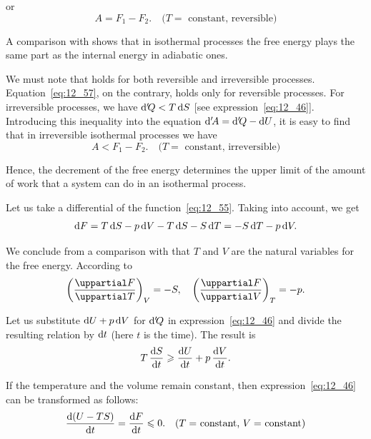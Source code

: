 \noindent
or
\begin{equation}\label{eq:12_57}
	A = F_1 - F_2.\quad \text{($T = $ constant, reversible)}
\end{equation}

\noindent
A comparison with  shows that in isothermal processes the free energy plays the same part as the internal energy in adiabatic ones.

We must note that  holds for both reversible and irreversible processes. Equation~\eqref{eq:12_57}, on the contrary, holds only for reversible processes. For irreversible processes, we have $\mathrm{d}'\!Q<T\,\mathrm{d} S$ [see expression~\eqref{eq:12_46}]. Introducing this inequality into the equation $\mathrm{d}'\!A=\mathrm{d}'\!Q-\mathrm{d} U$, it is easy to find that in irreversible isothermal processes we have
\begin{equation}\label{eq:12_58}
	A < F_1 - F_2.\quad \text{($T = $ constant, irreversible)}
\end{equation}

\noindent
Hence, the decrement of the free energy determines the upper limit of the amount of work that a system can do in an isothermal process.

Let us take a differential of the function~\eqref{eq:12_55}. Taking  into account, we get
\begin{equation}\label{eq:12_59}
	\mathrm{d} F = T\,\mathrm{d} S -  p\,\mathrm{d} V - T\,\mathrm{d} S - S\,\mathrm{d} T = -S\,\mathrm{d} T - p\,\mathrm{d} V.
\end{equation}

\noindent
We conclude from a comparison with  that $T$ and $V$ are the natural variables for the free energy. According to 
\begin{equation}\label{eq:12_60}
	\parenthesis{\diffpartial{F}{T}}_V = -S,\quad \parenthesis{\diffpartial{F}{V}}_T = -p.
\end{equation}

Let us substitute $\mathrm{d} U+p\,\mathrm{d} V$ for $\mathrm{d}'\!Q$ in expression~\eqref{eq:12_46} and divide the resulting relation by $\mathrm{d} t$ (here $t$ is the time). The result is
\begin{equation}\label{eq:12_61}
	T\,\frac{\mathrm{d} S}{\mathrm{d} t} \geqslant \frac{\mathrm{d} U}{\mathrm{d} t} + p\,\frac{\mathrm{d} V}{\mathrm{d} t}.
\end{equation}

\noindent
If the temperature and the volume remain constant, then expression~\eqref{eq:12_46} can be transformed as follows:
\vspace{2pt}
\begin{equation}\label{eq:12_62}
	\frac{\mathrm{d}(U-TS)}{\mathrm{d} t} = \frac{\mathrm{d} F}{\mathrm{d} t} \leqslant 0.\quad \text{($T = $ constant, $V = $ constant)}
\end{equation}

